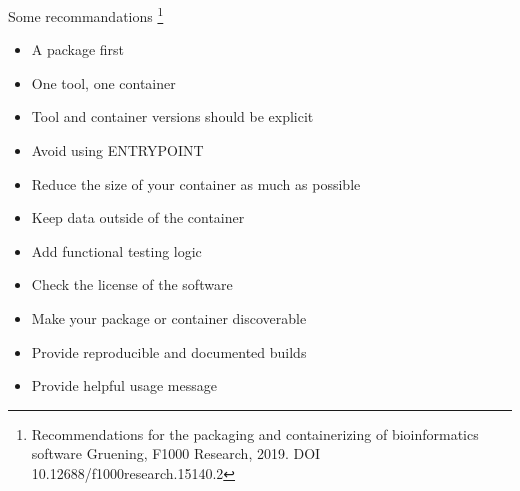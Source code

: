 \begin{frame}[<+->]
Some recommandations \footnote{Recommendations for the packaging and containerizing of bioinformatics software Gruening, F1000 Research, 2019. DOI 10.12688/f1000research.15140.2}
\begin{itemize}
\item A package first
\item One tool, one container
\item Tool and container versions should be explicit
\item Avoid using ENTRYPOINT
\item Reduce the size of your container as much as possible
\item Keep data outside of the container
\item Add functional testing logic
\item Check the license of the software
\item Make your package or container discoverable
\item Provide reproducible and documented builds
\item Provide helpful usage message
\end{itemize}
\end{frame}